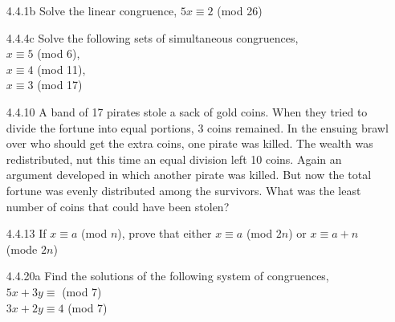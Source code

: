 \documentclass[12pt]{article}
\begin{document}
\begin{enumerate}
	\item[4.4.1b] Solve the linear congruence, $ 5x\equiv 2 $ (mod 26)
	
	\item[4.4.4c] Solve the following sets of simultaneous congruences, \\$ x \equiv 5 $ (mod 6),\\$ x \equiv 4 $ (mod 11),\\$ x \equiv 3 $ (mod 17)
	
	\item[4.4.10] A band of 17 pirates stole a sack of gold coins. When they tried to divide the fortune into equal portions, 3 coins remained. In the ensuing brawl over who should get the extra coins, one pirate was killed. The wealth was redistributed, nut this time an equal division left 10 coins. Again an argument developed in which another pirate was killed. But now the total fortune was evenly distributed among the survivors. What was the least number of coins that could have been stolen?
	
	\item[4.4.13] If $ x\equiv a$ (mod $ n $), prove that either $ x \equiv a$ (mod $ 2n $) or $ x \equiv a+n $ (mode $ 2n $)
		
	\item[4.4.20a] Find the solutions of the following system of congruences, \\ $ 5x+3y \equiv $ (mod 7) \\ $ 3x+2y \equiv 4 $ (mod 7)
\end{enumerate}
\end{document}
